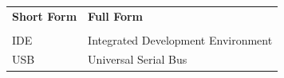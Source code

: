 \clearpage
{}
{}
\chapter*{{\fontsize{14pt}{16.8pt}\selectfont {Abbreviations}}}\\

\begin{table}[htb!]
\begin{tabular}{p{} p{}}
\textbf{Short Form} & \textbf{Full Form} \\
\vspace{1pt} & \vspace{1pt} 
\\
IDE & Integrated Development Environment \\
USB & Universal Serial Bus \\


\end{tabular}
\end{table}   

\vfill
\newpage

